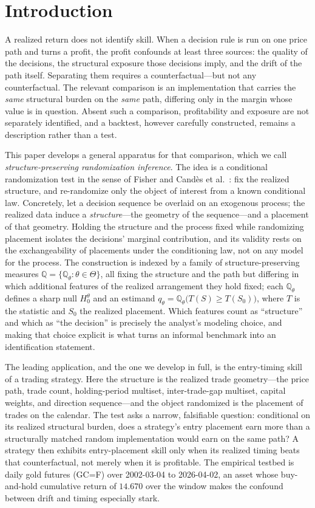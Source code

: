 \section{Introduction}

A realized return does not identify skill. When a decision rule is run on one
price path and turns a profit, the profit confounds at least three sources: the
quality of the decisions, the structural exposure those decisions imply, and the
drift of the path itself. Separating them requires a counterfactual---but not any
counterfactual. The relevant comparison is an implementation that carries the
\emph{same} structural burden on the \emph{same} path, differing only in the margin
whose value is in question. Absent such a comparison, profitability and exposure are
not separately identified, and a backtest, however carefully constructed, remains a
description rather than a test.

This paper develops a general apparatus for that comparison, which we call
\emph{structure-preserving randomization inference}. The idea is a conditional
randomization test in the sense of Fisher \cite{Fisher1935} and Cand\`es et al.\
\cite{Candes2018}: fix the realized structure, and re-randomize only the object of
interest from a known conditional law. Concretely, let a decision sequence be overlaid
on an exogenous process; the realized data induce a \emph{structure}---the geometry of
the sequence---and a placement of that geometry. Holding the structure and the process
fixed while randomizing placement isolates the decisions' marginal contribution, and
its validity rests on the exchangeability of placements under the conditioning law, not
on any model for the process. The construction is indexed by a family of
structure-preserving measures $\mathbb{Q}=\{\mathbb{Q}_\theta:\theta\in\Theta\}$, all
fixing the structure and the path but differing in which additional features of the
realized arrangement they hold fixed; each $\mathbb{Q}_\theta$ defines a sharp null
$H_0^\theta$ and an estimand $q_\theta=\mathbb{Q}_\theta\big(T(S)\ge T(S_0)\big)$, where
$T$ is the statistic and $S_0$ the realized placement. Which features count as
``structure'' and which as ``the decision'' is precisely the analyst's modeling choice,
and making that choice explicit is what turns an informal benchmark into an
identification statement.

The leading application, and the one we develop in full, is the entry-timing skill of a
trading strategy. Here the structure is the realized trade geometry---the price path,
trade count, holding-period multiset, inter-trade-gap multiset, capital weights, and
direction sequence---and the object randomized is the placement of trades on the
calendar. The test asks a narrow, falsifiable question: conditional on its realized
structural burden, does a strategy's entry placement earn more than a structurally
matched random implementation would earn on the same path? A strategy then exhibits
entry-placement skill only when its realized timing beats that counterfactual, not
merely when it is profitable. The empirical testbed is daily gold futures (GC=F) over
2002-03-04 to 2026-04-02, an asset whose buy-and-hold cumulative return of $14.670$ over
the window makes the confound between drift and timing especially stark.

